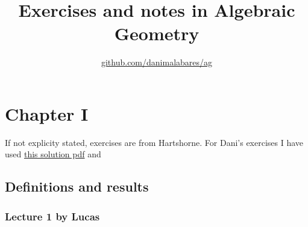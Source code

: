 


\title{Exercises and notes in Algebraic Geometry}

\usepackage[style=authortitle-terse,backend=bibtex]{biblatex}


\author{\href{https://github.com/danimalabares/ag}{github.com/danimalabares/ag}}


	\maketitle


\tableofcontents

\chapter{Chapter I}
If not explicity stated, exercises are from Hartshorne. For Dani's exercises I have used \href{https://notes.dzackgarza.com/attachments/Andrew%20Egbert.pdf}{this solution pdf} and 

\section{Definitions and results}


\subsection{Lecture 1 by Lucas}

